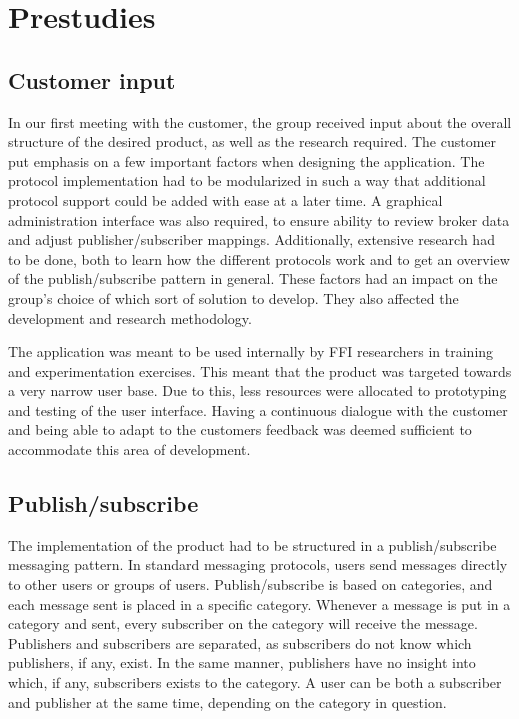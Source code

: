
\chapter{Prestudies}
\label{ch:prestudies}

\section{Customer input}
\label{sec:prestudies-customer_input}

In our first meeting with the customer, the group received input about the overall structure of the desired product, as well as the research required. The customer put emphasis on a few important factors when designing the application. The protocol implementation had to be modularized in such a way that additional protocol support could be added with ease at a later time. A graphical administration interface was also required, to ensure ability to review broker data and adjust publisher/subscriber mappings. Additionally, extensive research had to be done, both to learn how the different protocols work and to get an overview of the publish/subscribe pattern in general. These factors had an impact on the group's choice of which sort of solution to develop. They also affected the development and research methodology.

The application was meant to be used internally by FFI researchers in training and experimentation exercises. This meant that the product was targeted towards a very narrow user base. Due to this, less resources were allocated to prototyping and testing of the user interface. Having a continuous dialogue with the customer and being able to adapt to the customers feedback was deemed sufficient to accommodate this area of development.

\section{Publish/subscribe}
\label{sec:prestudies-publish_subscribe}

The implementation of the product had to be structured in a publish/subscribe messaging pattern. In standard messaging protocols, users send messages directly to other users or groups of users. Publish/subscribe is based on categories, and each message sent is placed in a specific category. Whenever a message is put in a category and sent, every subscriber on the category will receive the message. Publishers and subscribers are separated, as subscribers do not know which publishers, if any, exist. In the same manner, publishers have no insight into which, if any, subscribers exists to the category. A user can be both a subscriber and publisher at the same time, depending on the category in question.

